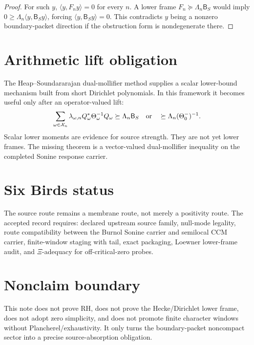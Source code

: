 \documentclass[11pt]{article}
\begin{document}
\begin{proof}
For such \(y\), \(\langle y,F_ny\rangle=0\) for every \(n\).  A lower frame
\(F_n\succeq \Lambda_n\mathsf B_S\) would imply
\(0\ge \Lambda_n\langle y,\mathsf B_Sy\rangle\), forcing
\(\langle y,\mathsf B_Sy\rangle=0\).  This contradicts \(y\) being a nonzero
boundary-packet direction if the obstruction form is nondegenerate there.
\end{proof}

\section{Arithmetic lift obligation}
The Heap--Soundararajan dual-mollifier method supplies a scalar lower-bound mechanism built
from short Dirichlet polynomials.  In this framework it becomes useful only after an
operator-valued lift:
\[
  \sum_{\omega\in\mathcal X_n}\lambda_{\omega,n}
  Q_\omega^*\Theta_\omega^{-1}Q_\omega
  \succeq \Lambda_n\mathsf B_S
  \quad\hbox{or}\quad
  \succeq \Lambda_n(\Theta_0^-)^{-1}.
\]
Scalar lower moments are evidence for source strength.  They are not yet lower frames.
The missing theorem is a vector-valued dual-mollifier inequality on the completed Sonine response
carrier.

\section{Six Birds status}
The source route remains a membrane route, not merely a positivity route.  The accepted record
requires: declared upstream source family, null-mode legality, route compatibility between the
Burnol Sonine carrier and semilocal CCM carrier, finite-window staging with tail, exact packaging,
Loewner lower-frame audit, and \(\Xi\)-adequacy for off-critical-zero probes.

\section{Nonclaim boundary}
This note does not prove RH, does not prove the Hecke/Dirichlet lower frame, does not adopt
zero simplicity, and does not promote finite character windows without Plancherel/exhaustivity.
It only turns the boundary-packet noncompact sector into a precise source-absorption obligation.
\end{document}
